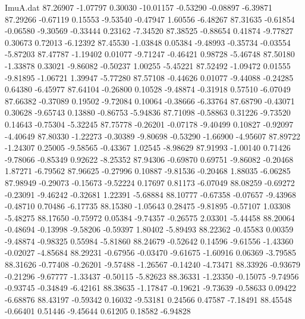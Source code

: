 \begin{filecontents}{ImuA.dat}
  87.26907   -1.07797    0.30030  -10.01157   -0.53290   -0.08897   -6.39871
  87.29266   -0.67119    0.15553   -9.53540   -0.47947    1.60556   -6.48267
  87.31635   -0.61854   -0.06580   -9.30569   -0.33444    0.23162   -7.34520
  87.38525   -0.88654    0.41874   -9.77827    0.30673    0.72013   -6.12392
  87.45530   -1.03848    0.05384   -9.48993   -0.35734   -0.03554   -5.87203
  87.47787   -1.19402    0.01077   -9.71247   -0.46421    0.98728   -5.46748
  87.50180   -1.33878    0.33021   -9.86082   -0.50237    1.00255   -5.45221
  87.52492   -1.09472    0.01555   -9.81895   -1.06721    1.39947   -5.77280
  87.57108   -0.44626    0.01077   -9.44088   -0.24285    0.64380   -6.45977
  87.64104   -0.26800    0.10528   -9.48874   -0.31918    0.57510   -6.07049
  87.66382   -0.37089    0.19502   -9.72084    0.10064   -0.38666   -6.33764
  87.68790   -0.43071    0.30628   -9.65743    0.13880   -0.86753   -5.94836
  87.71098   -0.58863    0.31226   -9.73520    0.14643   -0.75304   -5.32245
  87.75778   -0.26201   -0.07178   -9.40499    0.10827   -0.92097   -4.40649
  87.80330   -1.22273   -0.30389   -9.80698   -0.53290   -1.66900   -4.95607
  87.89722   -1.24307    0.25005   -9.58565   -0.43367    1.02545   -8.98629
  87.91993   -1.00140    0.71426   -9.78066   -0.85349    0.92622   -8.25352
  87.94306   -0.69870    0.69751   -9.86082   -0.20468    1.87271   -6.79562
  87.96625   -0.27996    0.10887   -9.81536   -0.20468    1.88035   -6.06285
  87.98949   -0.29073   -0.15673   -9.52224    0.17697    0.81173   -6.07049
  88.08259   -0.69272   -0.23091   -9.46242   -0.32681    1.22391   -5.68884
  88.10777   -0.67358   -0.07657   -9.43968   -0.48710    0.70486   -6.17735
  88.15380   -1.05643    0.28475   -9.81895   -0.57107    1.03308   -5.48275
  88.17650   -0.75972    0.05384   -9.74357   -0.26575    2.03301   -5.44458
  88.20064   -0.48694   -0.13998   -9.58206   -0.59397    1.80402   -5.89493
  88.22362   -0.45583    0.00359   -9.48874   -0.98325    0.55984   -5.81860
  88.24679   -0.52642    0.14596   -9.61556   -1.43360   -0.02027   -4.85684
  88.29231   -0.67956   -0.03470   -9.61675   -1.60916    0.06369   -3.79585
  88.31626   -0.77408   -0.26201   -9.57488   -1.26567   -0.14240   -4.73471
  88.33926   -0.93679   -0.21296   -9.67777   -1.33437   -0.50115   -5.82623
  88.36331   -1.23350   -0.15075   -9.74956   -0.93745   -0.34849   -6.42161
  88.38635   -1.17847   -0.19621   -9.73639   -0.58633    0.09422   -6.68876
  88.43197   -0.59342    0.16032   -9.53181    0.24566    0.47587   -7.18491
  88.45548   -0.66401    0.51446   -9.45644    0.61205    0.18582   -6.94828

\end{filecontents}
